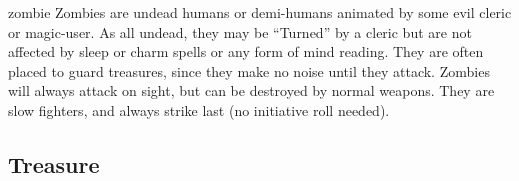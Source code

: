 \documentclass[letterpaper,serif,tightsqueeze]{module}
\begin{document}
\begin{newmonster}{zombie}
Zombies are undead humans or demi-humans animated by some
evil cleric or magic-user. As all undead, they may be ``Turned'' by
a cleric but are not affected by sleep or charm spells or any form
of mind reading. They are often placed to guard treasures, since
they make no noise until they attack. Zombies will always attack on
sight, but can be destroyed by normal weapons. They are slow
fighters, and always strike last (no initiative roll needed).
\end{newmonster}

\begin{onecolumnfloat}[t]
\part{Treasure}
\end{onecolumnfloat}
\end{document}
